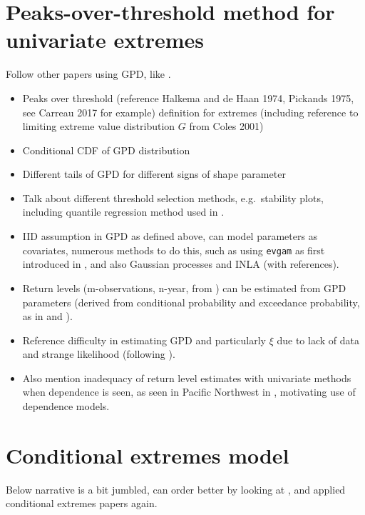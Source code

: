 \documentclass{article}
\numberwithin{equation}{section}
\begin{document}
\section{Peaks-over-threshold method for univariate extremes}\label{sec:uni}

Follow other papers using GPD, like \cite{Carreau2017}. 
\begin{itemize}
  \item Peaks over threshold (reference Halkema and de Haan 1974, Pickands 1975, see Carreau 2017 for example) definition for extremes (including reference to limiting extreme value distribution $G$ from Coles 2001)
  \item Conditional CDF of GPD distribution
  \item Different tails of GPD for different signs of shape parameter
  \item Talk about different threshold selection methods, e.g.\ stability plots, including quantile regression method used in \cite{Youngman2019}.
  \item IID assumption in GPD as defined above, can model parameters as covariates, numerous methods to do this, such as using \texttt{evgam} as first introduced in \cite{Youngman2019}, and also Gaussian processes and INLA (with references).
  \item Return levels (m-observations, n-year, from \cite{Coles2001}) can be estimated from GPD parameters (derived from conditional probability and exceedance probability, as in \cite{Cooley2007} and \cite{Coles2001}). 
  \item Reference difficulty in estimating GPD and particularly $\xi$ due to lack of data and strange likelihood (following \cite{Coles2001}). 
  \item Also mention inadequacy of return level estimates with univariate methods when dependence is seen, as seen in Pacific Northwest in \cite{Winter2016}, motivating use of dependence models. 
\end{itemize}

\section{Conditional extremes model}\label{sec:ce}

Below narrative is a bit jumbled, can order better by looking at \cite{Heffernan2004}, \cite{Keef2013} and applied conditional extremes papers again. 
\end{document}
